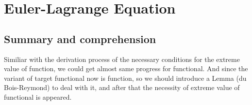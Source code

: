 \newpage
\section{Euler-Lagrange Equation}
\subsection{Summary and comprehension}
Similiar with the derivation process of the necessary conditions for the extreme value of function, we could get almost same progress for functional. And since the variant of target functional now is function, so we should introduce a Lemma (du Bois-Reymond) to deal with it, and after that the necessity of extreme value of functional is appeared. \\
\newline\newline
{}
